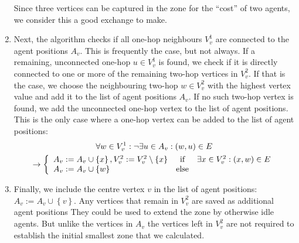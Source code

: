 \begin{enumerate}
        Since three vertices can be captured in the zone for the \enquote{cost} of two agents, we consider this a good exchange to make.
  \item Next, the algorithm checks if all one-hop neighbours $V_v^1$ are connected to the agent positions $A_v$.
        This is frequently the case, but not always.
        If a remaining, unconnected one-hop $u \in V_v^1$ is found, we check if it is directly connected to one or more of the remaining two-hop vertices in $V_v^2$.
        If that is the case, we choose the neighbouring two-hop $w \in V_v^2$ with the highest vertex value and add it to the list of agent positions $A_v$.
        If no such two-hop vertex is found, we add the unconnected one-hop vertex to the list of agent positions.
        This is the only case where a one-hop vertex can be added to the list of agent positions: \begin{multline}
        \forall w \in V_v^1: \lnot \exists u \in A_v: \left(w, u \right ) \in E \\\rightarrow \left\{\begin{array}{lcl}
A_v := A_v \cup \left\{x\right\}, V_v^2 := V_v^2 \setminus \left\{x\right\} & \textup{if} & \exists x \in V_v^2: \left(x, w \right ) \in E\\
A_v := A_v \cup \left\{w\right\} &\textup{else} &
\end{array}\right.
        \end{multline}
  \item Finally, we include the centre vertex $v$ in the list of agent positions: $A_v := A_v \cup \left\{v\right\}$.
        Any vertices that remain in $V_v^2$ are saved as additional agent positions
        They could be used to extend the zone by otherwise idle agents.
        But unlike the vertices in $A_v$ the vertices left in $V_{v}^{2}$ are not required to establish the initial smallest zone that we calculated.
\end{enumerate}
